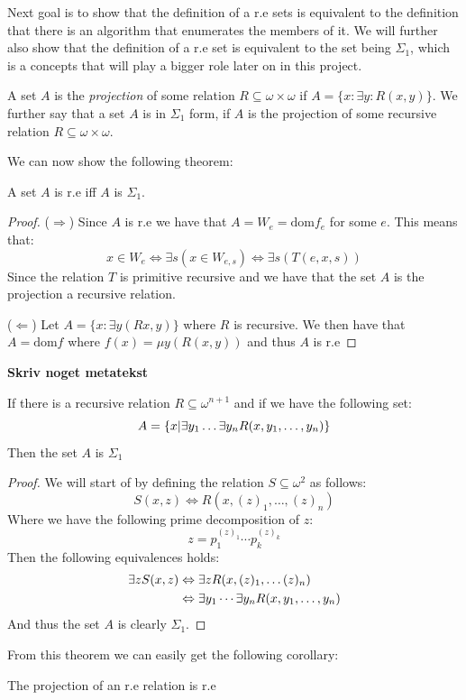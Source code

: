 \documentclass[../main.tex]{subfiles}
\begin{document}
Next goal is to show that the definition of a r.e sets is equivalent to the
definition that there is an algorithm that enumerates the members of it. We
will further also show that the definition of a r.e set is equivalent to the
set being $\Sigma_1$, which is a concepts that will play a bigger role later on
in this project.
\begin{defi}
	A set $A$ is the \textit{projection} of some relation $R\subseteq
	\omega\times\omega$ if $A=\{x:\exists y: R(x,y)\}$. We further say that
	a set $A$ is in $\Sigma_1$ form, if $A$ is the projection of some
	recursive relation $R\subseteq\omega\times\omega$.
\end{defi}
We can now show the following theorem:
\begin{thm}
	A set $A$ is r.e iff $A$ is $\Sigma_1$.
\end{thm}
\begin{proof}
	($\Rightarrow$) Since $A$ is r.e we have that $A=W_e=\text{dom} f_e$
	for some $e$. This means that:
	$$x\in W_e\Leftrightarrow\exists s(x\in W_{e,s})\Leftrightarrow \exists
	s(T(e,x,s))$$
	Since the relation $T$ is primitive recursive and we have that the set $A$
	is the projection a recursive relation.

	($\Leftarrow$) Let $A=\{x:\exists y(Rx,y)\}$ where $R$ is recursive. We
	then have that $A=\text{dom} f$ where $f(x)=\mu y(R(x,y))$ and thus $A$
	is r.e
\end{proof}
\textbf{Skriv noget metatekst}
\begin{thm}
	\label{thm:RecSigma}
	If there is a recursive relation $R\subseteq\omega^{n+1}$ and if we
	have the following set:
	$$A=\{x|\exists y_1\ldots\exists  y_n R(x,y_1,\ldots,y_n)\}$$
	Then the set $A$ is $\Sigma_1$
\end{thm}
\begin{proof}
	We will start of by defining the relation $S\subseteq\omega^2$ as
	follows:
	$$S(x,z)\Leftrightarrow R(x,(z)_1,\ldots,(z)_n)$$
	Where we have the following prime decomposition of $z$:
	$$z=p_1^{(z)_1}\cdots p_k^{(z)_k}$$
	Then the following equivalences holds:
	\begin{align*}
		\exists zS(x,z)&\Leftrightarrow \exists z R(x,(z)_1,\ldots
		(z)_n)\\
			       &\Leftrightarrow \exists y_1\cdots \exists y_n
			       R(x,y_1,\ldots,y_n)
	\end{align*}
	And thus the set $A$ is clearly $\Sigma_1$.
\end{proof}
From this theorem we can easily get the following corollary:
\begin{cor}
	The projection of an r.e relation is r.e
\end{cor}
\end{document}
